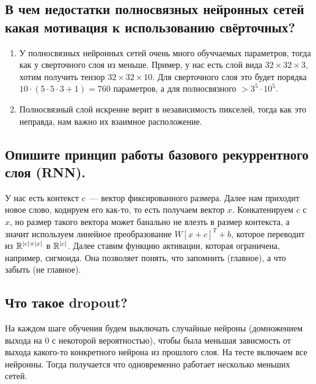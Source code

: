 \subsection{В чем недостатки полносвязных нейронных сетей какая мотивация к использованию
свёрточных?}

\begin{enumerate}
    \item У полносвязных нейронных сетей очень много обуччаемых параметров, тогда как у сверточного слоя из меньше. Пример, у нас есть слой вида $32 \times 32 \times 3$, хотим получить тензор $32 \times 32 \times 10$. Для сверточного слоя это будет порядка $10 \cdot (5 \cdot 5 \cdot 3 + 1) = 760$ параметров, а для полносвязного $> 3^5 \cdot 10^5$.
    \item Полносвязный слой искренне верит в независимость пикселей, тогда как это неправда, нам важно их взаимное расположение.
\end{enumerate}





\subsection{Опишите принцип работы базового рекуррентного слоя (RNN).}

У нас есть контекст $c$~--- вектор фиксированного размера. Далее нам приходит новое слово, кодируем его как-то, то есть получаем вектор $x$. Конкатенируем $c$ с $x$, но размер такого вектора может банально не влезть в размер контекста, а значит используем линейное преобразование $W[x + c]^T + b$, которое переводит из $\mathbb{R}^{|c| + |x|}$ в $\mathbb{R}^{|c|}$. Далее ставим функцию активации, которая ограничена, например, сигмоида. Она позволяет понять, что запомнить (главное), а что забыть (не главное).









\subsection{Что такое dropout?}

На каждом шаге обучения будем выключать случайные нейроны (домножением выхода на 0 с некоторой вероятностью), чтобы была меньшая зависмость от выхода какого-то конкретного нейрона из прошлого слоя. На тесте включаем все нейронны. Тогда получается что одновременно работает несколько меньших сетей. 

